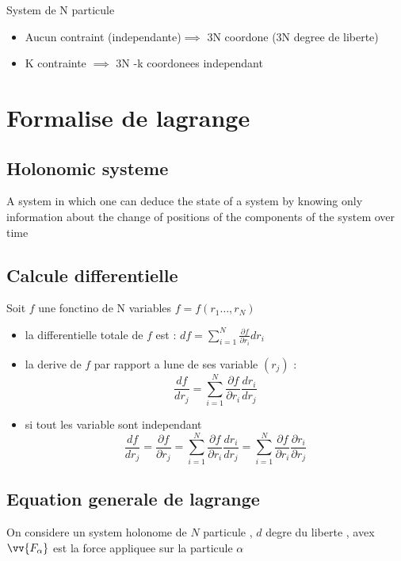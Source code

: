 \documentclass[12pt]{book}
\begin{document}
            System de N particule 
            \begin{itemize}
                \item Aucun contraint (independante)$\implies$ 3N coordone (3N degree de liberte)
                \item K contrainte $\implies$ 3N -k coordonees independant 
            \end{itemize}
    \chapter{Formalise de lagrange}
        \section{Holonomic systeme }
            A system in which one can deduce the state of a system by knowing only information about the change of positions of the components of the system over time 
        \section{Calcule differentielle}
            Soit $f$ une fonctino de N variables $f=f(r_1 \ldots , r_N)$
            \begin{itemize}
                \item la differentielle totale de $f$ est : $df = \sum^N_{i=1}\frac{\partial f}{\partial r_i}dr_i$
                \item la derive de $f$ par rapport a lune de ses variable $(r_j)$ :
                 \[ \frac{df}{dr_j} = \sum^N_{i=1}\frac{\partial f}{\partial r_i}\frac{dr_i}{dr_j} \]
                 \item si tout les variable sont independant
                 \[ \frac{df}{dr_j} = \frac{\partial f}{\partial r_j} = \sum^N_{i=1}\frac{\partial f}{\partial r_i}\frac{dr_i}{dr_j} = \sum^N_{i=1}\frac{\partial f}{\partial r_i}\frac{\partial r_i}{\partial r_j} \]
            \end{itemize}
            \pagebreak
        \section{Equation generale de lagrange }
            On considere un system holonome de $N$ particule , $d$ degre du liberte , avex $\vv{F_\alpha}$ est la force appliquee sur la particule $\alpha$
\end{document}

